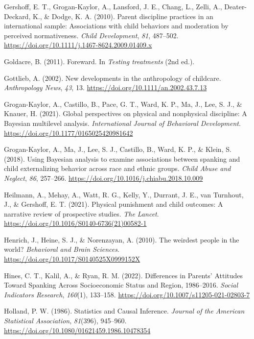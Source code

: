 \documentclass[
  letterpaper,
  DIV=11,
  numbers=noendperiod]{scrreprt}
\newlength{\cslhangindent}
\newenvironment{CSLReferences}[2] %
 {\begin{list}{}{%
  \setlength{\itemindent}{0pt}
  \setlength{\leftmargin}{0pt}
  \setlength{\parsep}{0pt}
  \ifodd #1
   \setlength{\leftmargin}{\cslhangindent}
   \setlength{\itemindent}{-1\cslhangindent}
  \fi
  \setlength{\itemsep}{#2\baselineskip}}}
 {\end{list}}
\begin{document}
\begin{CSLReferences}{1}{0}
Gershoff, E. T., Grogan-Kaylor, A., Lansford, J. E., Chang, L., Zelli,
A., Deater-Deckard, K., \& Dodge, K. A. (2010). Parent discipline
practices in an international sample: Associations with child behaviors
and moderation by perceived normativeness. \emph{Child Development},
\emph{81}, 487--502.
\url{https://doi.org/10.1111/j.1467-8624.2009.01409.x}

Goldacre, B. (2011). {Foreward}. In \emph{Testing treatments} (2nd ed.).

Gottlieb, A. (2002). New developments in the anthropology of childcare.
\emph{Anthropology News}, \emph{43}, 13.
\url{https://doi.org/10.1111/an.2002.43.7.13}

Grogan-Kaylor, A., Castillo, B., Pace, G. T., Ward, K. P., Ma, J., Lee,
S. J., \& Knauer, H. (2021). {Global perspectives on physical and
nonphysical discipline: A {B}ayesian multilevel analysis}.
\emph{International Journal of Behavioral Development}.
\url{https://doi.org/10.1177/0165025420981642}

Grogan-Kaylor, A., Ma, J., Lee, S. J., Castillo, B., Ward, K. P., \&
Klein, S. (2018). Using {B}ayesian analysis to examine associations
between spanking and child externalizing behavior across race and ethnic
groups. \emph{Child Abuse and Neglect}, \emph{86}, 257--266.
\url{https://doi.org/10.1016/j.chiabu.2018.10.009}

Heilmann, A., Mehay, A., Watt, R. G., Kelly, Y., Durrant, J. E., van
Turnhout, J., \& Gershoff, E. T. (2021). Physical punishment and child
outcomes: A narrative review of prospective studies. \emph{The Lancet}.
\url{https://doi.org/10.1016/S0140-6736(21)00582-1}

Henrich, J., Heine, S. J., \& Norenzayan, A. (2010). {The weirdest
people in the world?} \emph{Behavioral and Brain Sciences}.
\url{https://doi.org/10.1017/S0140525X0999152X}

Hines, C. T., Kalil, A., \& Ryan, R. M. (2022). {Differences in Parents'
Attitudes Toward Spanking Across Socioeconomic Status and Region,
1986--2016}. \emph{Social Indicators Research}, \emph{160}(1), 133--158.
\url{https://doi.org/10.1007/s11205-021-02803-7}

Holland, P. W. (1986). {Statistics and Causal Inference}. \emph{Journal
of the American Statistical Association}, \emph{81}(396), 945--960.
\url{https://doi.org/10.1080/01621459.1986.10478354}


\end{CSLReferences}
\end{document}
